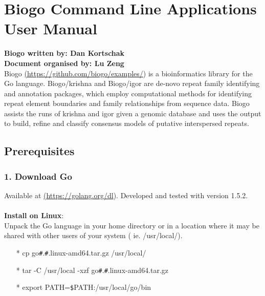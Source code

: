 \documentclass[12pt]{report}
\begin{document}
 \sloppy

\author{Author Name}
\date{Day Month Year}


\section*{Biogo Command Line Applications User Manual}
\textbf{Biogo written by: Dan Kortschak} \\
\textbf{Document organised by: Lu Zeng} \\

Biogo \href{<url>}(\url{https://github.com/biogo/examples/}) is a bioinformatics library for the Go language. Biogo/krishna and Biogo/igor are de-novo repeat family identifying and annotation packages, which employ computational methods for identifying repeat element boundaries and family relationships from sequence data. Biogo assists the runs of krishna and igor given a genomic database and uses the output to build, refine and classify consensus models of putative interspersed repeats. 

\subsection*{{Prerequisites}}

\subsubsection{1. Download Go }
Available at \href{<url>} (\url{https://golang.org/dl}). Developed and tested with version 1.5.2. \\\\
\textbf{Install on Linux}: \\
Unpack the Go language in your home directory or in a location where it may be shared with other users of your system ( ie. /usr/local/).

\begin{enumerate}
	\item[*] cp go\texttt{\#}.\texttt{\#}.linux-amd64.tar.gz /usr/local/ 
	\item[*] tar -C /usr/local -xzf go\texttt{\#}.\texttt{\#}.linux-amd64.tar.gz
	\item[*] export PATH=\texttt{\$}PATH:/usr/local/go/bin
\end{enumerate}
\end{document}
